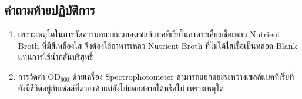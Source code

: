 \subsection{คำถามท้ายปฏิบัติการ}
\begin{enumerate}
    \item เพราะเหตุใดในการวัดความหนาแน่นของเซลล์แบคทีเรียในอาหารเลี้ยงเชื้อเหลว Nutrient Broth ที่มีสีเหลืองใส จึงต้องใช้อาหารเหลว Nutrient Broth ที่ไม่ได้ใส่เชื้อเป็นหลอด Blank แทนการใช้น้ำกลั่นบริสุทธิ์
    \item การวัดค่า $\text{OD}_{600}$ ด้วยเครื่อง Spectrophotometer สามารถแยกแยะระหว่างเซลล์แบคทีเรียที่ยังมีชีวิตอยู่กับเซลล์ที่ตายแล้วแต่ยังไม่แตกสลายได้หรือไม่ เพราะเหตุใด
\end{enumerate}
